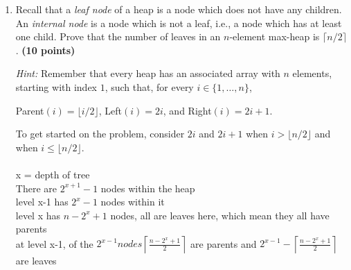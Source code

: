 \documentclass[11pt]{amsart}
\begin{document}
\begin{enumerate}
\item Recall that a \textit{leaf node} of a heap is a node which does not have any children. An \textit{internal node} is a node which is not a leaf, i.e., a node which has at least one child. Prove that the number of leaves in an $n$-element max-heap is $\lceil n / 2 \rceil$. \textbf{(10 points)}

\smallskip

\textit{Hint: } Remember that every heap has an associated array with $n$ elements, starting with index $1$, such that, for every $i \in \{1,\ldots,n\}$,
\begin{center}
Parent$(i) = \lfloor i / 2 \rfloor$, Left$(i) = 2i$, and Right$(i) = 2i+1$.
\end{center}
To get started on the problem, consider $2i$ and $2i+1$ when $i > \lfloor n / 2 \rfloor$ and when $i \leq \lfloor n / 2 \rfloor$.
\\ \\
x = depth of tree\\
There are $2^{x+1}-1$ nodes within the heap\\level x-1 has $2^x-1$ nodes within it\\level x has $n-2^x+1$ nodes, all are leaves here, which mean they all have parents\\ at level x-1, of the $2^{x-1} nodes \left\lceil \frac{n-2^x+1}{2}\right\rceil$ are parents and  $2^{x-1}-\left\lceil \frac{n-2^x+1}{2}\right\rceil$ are leaves
\end{enumerate}
\end{document}

